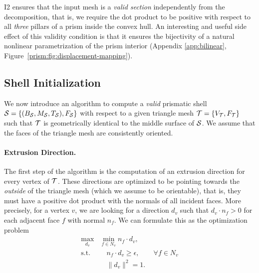 I2 ensures that the input mesh is a \emph{valid section} independently from the decomposition, that is, we require the dot product to be positive with respect to all \emph{three} pillars of a prism inside the convex hull. An interesting and useful side effect of this validity condition is that it ensures the bijectivity of a natural nonlinear parametrization of the prism interior (Appendix \ref{app:bilinear}, Figure~\ref{prism:fig:displacement-mapping}).

\subsection{Shell Initialization}
\label{prism:sec:initialization}

We now introduce an algorithm to compute a \emph{valid} prismatic shell $\S = \{(B_\S,M_\S,T_\S),F_\S\}$ with respect to a given triangle mesh $\T = \{V_\T,F_\T\}$ such that $\T$ is geometrically identical to the middle surface of $\S$.  We assume that the faces of the triangle mesh are consistently oriented.

\paragraph{Extrusion Direction.} The first step of the algorithm is the computation of an extrusion direction for every vertex of $\T$. These directions are optimized to be pointing towards the \emph{outside} of the triangle mesh (which we assume to be orientable), that is,
they must have a positive dot product with the normals of all incident faces. More precisely, for a vertex $v$, we are looking for a direction $d_v$ such that $d_v \cdot n_f > 0$ for each adjacent face $f$ with normal $n_f$. We can formulate this as the optimization problem
\begin{equation}
\label{eq:OPT}
\begin{split}
    \max_{d_v}& \min_{f \in N_v} n_f \cdot d_v,\\
    \text{s.t. }&\quad n_f \cdot d_v \geq {\epsilon}, \qquad \forall f \in N_v\\
               &\quad  \|d_v\|^2 = 1.
\end{split}
\end{equation}

